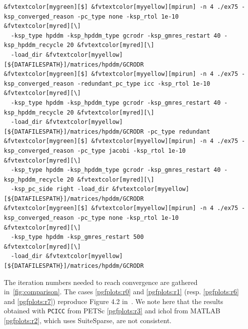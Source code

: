 \documentclass[3p,11pt]{elsarticle}
\newcommand{\pk}[1]{\texttt{#1}}
\begin{document}
\begin{Verbatim}[fontsize=\footnotesize,frame=single,framerule=0.1mm,commandchars=&\[\]]
&fvtextcolor[mygreen][$] &fvtextcolor[myyellow][mpirun] -n 4 ./ex75 -ksp_converged_reason -pc_type none -ksp_rtol 1e-10             &fvtextcolor[myred][\]
  -ksp_type hpddm -ksp_hpddm_type gcrodr -ksp_gmres_restart 40 -ksp_hpddm_recycle 20 &fvtextcolor[myred][\]
  -load_dir &fvtextcolor[myyellow][${DATAFILESPATH}]/matrices/hpddm/GCRODR
&fvtextcolor[mygreen][$] &fvtextcolor[myyellow][mpirun] -n 4 ./ex75 -ksp_converged_reason -redundant_pc_type icc -ksp_rtol 1e-10    &fvtextcolor[myred][\]
  -ksp_type hpddm -ksp_hpddm_type gcrodr -ksp_gmres_restart 40 -ksp_hpddm_recycle 20 &fvtextcolor[myred][\]
  -load_dir &fvtextcolor[myyellow][${DATAFILESPATH}]/matrices/hpddm/GCRODR -pc_type redundant
&fvtextcolor[mygreen][$] &fvtextcolor[myyellow][mpirun] -n 4 ./ex75 -ksp_converged_reason -pc_type jacobi -ksp_rtol 1e-10           &fvtextcolor[myred][\]
  -ksp_type hpddm -ksp_hpddm_type gcrodr -ksp_gmres_restart 40 -ksp_hpddm_recycle 20 &fvtextcolor[myred][\]
  -ksp_pc_side right -load_dir &fvtextcolor[myyellow][${DATAFILESPATH}]/matrices/hpddm/GCRODR
&fvtextcolor[mygreen][$] &fvtextcolor[myyellow][mpirun] -n 4 ./ex75 -ksp_converged_reason -pc_type none -ksp_rtol 1e-10             &fvtextcolor[myred][\]
  -ksp_type hpddm -ksp_gmres_restart 500                                             &fvtextcolor[myred][\]
  -load_dir &fvtextcolor[myyellow][${DATAFILESPATH}]/matrices/hpddm/GCRODR
\end{Verbatim}
The iteration numbers
needed to reach convergence are gathered in~\cref{fig:comparison}.  The
cases \ref{pgfplots:r0} and
\ref{pgfplots:r1} (resp. \ref{pgfplots:r6} and \ref{pgfplots:r7}) reproduce Figure 4.2 in~\cite{parks2006recycling}.
We note here that the results obtained with
\pk{PCICC} from PETSc \ref{pgfplots:r3} and ichol from MATLAB \ref{pgfplots:r2}, which uses SuiteSparse, are not consistent.
\end{document}
